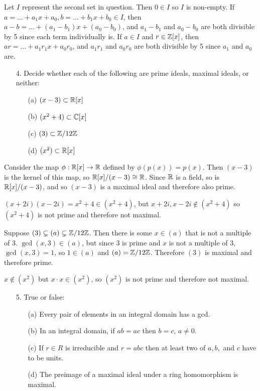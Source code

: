 \documentclass{hmwk}
\begin{document}
\pre Let $I$ represent the second set in question. Then $0 \in I$ so $I$ is non-empty. If $a = \dots + a_1x + a_0, b = \dots + b_1x + b_0 \in I$, then $a - b = \dots + (a_1 - b_1)x + (a_0 - b_0)$, and $a_1 - b_1$ and $a_0 - b_0$ are both divisible by 5 since each term individually is. If $a \in I$ and $r \in \mathbb{Z}[x]$, then $ar = \dots + a_1r_1x + a_0r_0$, and $a_1r_1$ and $a_0r_0$ are both divisible by 5 since $a_1$ and $a_0$ are. 

\begin{itemize}
    \item[4.] Decide whether each of the following are prime ideals, maximal ideals, or neither:
    \begin{itemize}
        \item[(a)] $(x - 3) \subset \mathbb{R}[x]$
        \item[(b)] $(x^2 + 4) \subset \mathbb{C}[x]$
        \item[(c)] $(3) \subset \mathbb{Z}/12\mathbb{Z}$
        \item[(d)] $(x^2) \subset \mathbb{R}[x]$
    \end{itemize}
\end{itemize}

\pre Consider the map $\phi: \mathbb{R}[x] \rightarrow \mathbb{R}$ defined by $\phi(p(x)) = p(x)$. Then $(x - 3)$ is the kernel of this map, so $\mathbb{R}[x]/(x - 3) \cong \mathbb{R}$. Since $\mathbb{R}$ is a field, so is $\mathbb{R}[x]/(x - 3)$, and so $(x - 3)$ is a maximal ideal and therefore also prime. 

\pre $(x + 2i)(x - 2i) = x^2 + 4 \in (x^2 + 4)$, but $x + 2i, x - 2i \notin (x^2 + 4)$ so $(x^2 + 4)$ is not prime and therefore not maximal.

\pre Suppose $(3) \subsetneq (a) \subsetneq \mathbb{Z}/12\mathbb{Z}$. Then there is some $x \in (a)$ that is not a multiple of 3. $\gcd(x, 3) \in (a)$, but since 3 is prime and $x$ is not a multiple of $3$, $\gcd(x, 3) = 1$, so $1 \in (a)$ and $(a) = \mathbb{Z}/12\mathbb{Z}$. Therefore $(3)$ is maximal and therefore prime. 

\pre $x \notin (x^2)$ but $x \cdot x \in (x^2)$, so $(x^2)$ is not prime and therefore not maximal. 

\begin{itemize}
    \item[5.] True or false:
    \begin{itemize}
        \item[(a)] Every pair of elements in an integral domain has a gcd.
        \item[(b)] In an integral domain, if $ab = ac$ then $b = c$, $a\neq 0.$
        \item[(c)] If $r \in R$ is irreducible and $r = abc$ then at least two of $a, b,$ and $c$ have to be units.
        \item[(d)] The preimage of a maximal ideal under a ring homomorphism is maximal.
    \end{itemize}
\end{itemize}
\end{document}
